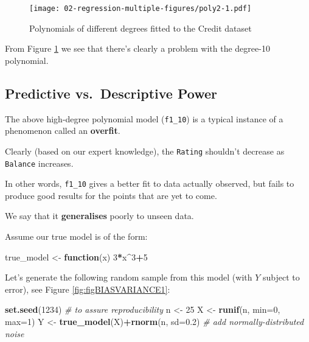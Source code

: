 \documentclass[10pt,b5paper,krantz1]{krantz}
\newenvironment{Shaded}{\begin{snugshade}}{\end{snugshade}}
\newcommand{\CommentTok}[1]{\textcolor[rgb]{0.37,0.37,0.37}{\textit{#1}}}
\newcommand{\ControlFlowTok}[1]{\textcolor[rgb]{0.27,0.27,0.27}{\textbf{#1}}}
\newcommand{\DataTypeTok}[1]{\textcolor[rgb]{0.27,0.27,0.27}{#1}}
\newcommand{\DecValTok}[1]{\textcolor[rgb]{0.06,0.06,0.06}{#1}}
\newcommand{\FloatTok}[1]{\textcolor[rgb]{0.06,0.06,0.06}{#1}}
\newcommand{\KeywordTok}[1]{\textcolor[rgb]{0.27,0.27,0.27}{\textbf{#1}}}
\newcommand{\NormalTok}[1]{#1}
\newcommand{\OperatorTok}[1]{\textcolor[rgb]{0.43,0.43,0.43}{\textbf{#1}}}
\newcommand{\StringTok}[1]{\textcolor[rgb]{0.5,0.5,0.5}{#1}}
\begin{document}
\begin{figure}
\hypertarget{fig:poly2}{%
\centering
\texttt{[image: 02-regression-multiple-figures/poly2-1.pdf]}
\caption{Polynomials of different degrees fitted to the Credit dataset}\label{fig:poly2}
}
\end{figure}

From Figure \ref{fig:poly2} we see that there's clearly a problem
with the degree-10 polynomial.

\hypertarget{predictive-vs.-descriptive-power}{%
\subsection{Predictive vs.~Descriptive Power}\label{predictive-vs.-descriptive-power}}

The above high-degree polynomial model (\texttt{f1\_10}) is a typical instance
of a phenomenon called an \textbf{overfit}.

Clearly (based on our expert knowledge), the \texttt{Rating} shouldn't
decrease as \texttt{Balance} increases.

In other words, \texttt{f1\_10} gives a better fit to data actually observed,
but fails to produce good results for the points that are yet to come.

We say that it \textbf{generalises} poorly to unseen data.

Assume our true model is of the form:

\begin{Shaded}
\begin{Highlighting}[]
\NormalTok{true_model <-}\StringTok{ }\ControlFlowTok{function}\NormalTok{(x) }\DecValTok{3}\OperatorTok{*}\NormalTok{x}\OperatorTok{^}\DecValTok{3}\OperatorTok{+}\DecValTok{5}
\end{Highlighting}
\end{Shaded}

Let's generate the following random sample from this model (with \(Y\) subject
to error), see Figure \ref{fig:figBIASVARIANCE1}:

\begin{Shaded}
\begin{Highlighting}[]
\KeywordTok{set.seed}\NormalTok{(}\DecValTok{1234}\NormalTok{) }\CommentTok{# to assure reproducibility}
\NormalTok{n <-}\StringTok{ }\DecValTok{25}
\NormalTok{X <-}\StringTok{ }\KeywordTok{runif}\NormalTok{(n, }\DataTypeTok{min=}\DecValTok{0}\NormalTok{, }\DataTypeTok{max=}\DecValTok{1}\NormalTok{)}
\NormalTok{Y <-}\StringTok{ }\KeywordTok{true_model}\NormalTok{(X)}\OperatorTok{+}\KeywordTok{rnorm}\NormalTok{(n, }\DataTypeTok{sd=}\FloatTok{0.2}\NormalTok{) }\CommentTok{# add normally-distributed noise}
\end{Highlighting}
\end{Shaded}
\end{document}
